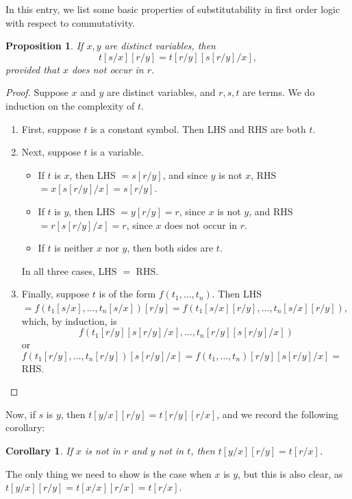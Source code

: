 \documentclass[12pt]{article}
\newtheorem{prop}{Proposition}
\newtheorem{cor}{Corollary}
\begin{document}
In this entry, we list some basic properties of substitutability in first order logic with respect to commutativity.  

\begin{prop} If $x,y$ are distinct variables, then $$t[s/x][r/y]=t[r/y][s[r/y]/x],$$ provided that $x$ does not occur in $r$. \end{prop}
\begin{proof}
Suppose $x$ and $y$ are distinct variables, and $r,s,t$ are terms.  We do induction on the complexity of $t$.
\begin{enumerate}
\item First, suppose $t$ is a constant symbol.  Then LHS and RHS are both $t$.  
\item Next, suppose $t$ is a variable.  
\begin{itemize}
\item If $t$ is $x$, then LHS $=s[r/y]$, and since $y$ is not $x$, RHS $=x[s[r/y]/x]=s[r/y]$.  
\item If $t$ is $y$, then LHS $=y[r/y]=r$, since $x$ is not $y$, and RHS $=r[s[r/y]/x]=r$, since $x$ does not occur in $r$.  
\item If $t$ is neither $x$ nor $y$, then both sides are $t$.
\end{itemize}
In all three cases, LHS $=$ RHS.  
\item Finally, suppose $t$ is of the form $f(t_1,\ldots,t_n)$.  Then LHS $= f(t_1[s/x],\ldots, t_n[s/x]) [r/y] = f(t_1[s/x][r/y], \ldots, t_n[s/x][r/y])$, which, by induction, is $$f(t_1[r/y][s[r/y]/x], \ldots, t_n[r/y][s[r/y]/x])$$  or $f(t_1[r/y], \ldots, t_n[r/y]) [s[r/y]/x] = f(t_1,\ldots, t_n) [r/y][s[r/y]/x] = $RHS.
\end{enumerate}
\end{proof}
Now, if $s$ is $y$, then $t[y/x][r/y]=t[r/y][r/x]$, and we record the following corollary:
\begin{cor} If $x$ is not in $r$ and $y$ not in $t$, then $t[y/x][r/y]=t[r/x]$. \end{cor}
The only thing we need to show is the case when $x$ is $y$, but this is also clear, as $t[y/x][r/y]=t[x/x][r/x]=t[r/x]$.
\end{document}
